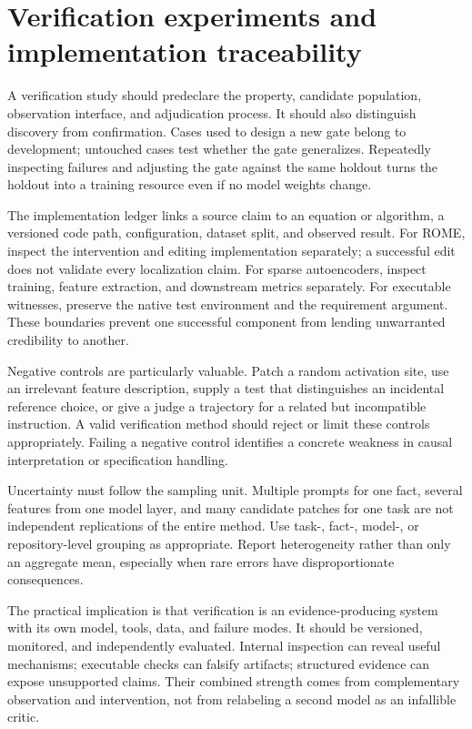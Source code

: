 \section{Verification experiments and implementation traceability}\label{sec:C25:experiments}
A verification study should predeclare the property, candidate population, observation interface, and adjudication process. It should also distinguish discovery from confirmation. Cases used to design a new gate belong to development; untouched cases test whether the gate generalizes. Repeatedly inspecting failures and adjusting the gate against the same holdout turns the holdout into a training resource even if no model weights change.

The implementation ledger links a source claim to an equation or algorithm, a versioned code path, configuration, dataset split, and observed result. For ROME, inspect the intervention and editing implementation separately; a successful edit does not validate every localization claim. For sparse autoencoders, inspect training, feature extraction, and downstream metrics separately. For executable witnesses, preserve the native test environment and the requirement argument. These boundaries prevent one successful component from lending unwarranted credibility to another.

Negative controls are particularly valuable. Patch a random activation site, use an irrelevant feature description, supply a test that distinguishes an incidental reference choice, or give a judge a trajectory for a related but incompatible instruction. A valid verification method should reject or limit these controls appropriately. Failing a negative control identifies a concrete weakness in causal interpretation or specification handling.

Uncertainty must follow the sampling unit. Multiple prompts for one fact, several features from one model layer, and many candidate patches for one task are not independent replications of the entire method. Use task-, fact-, model-, or repository-level grouping as appropriate. Report heterogeneity rather than only an aggregate mean, especially when rare errors have disproportionate consequences.

The practical implication is that verification is an evidence-producing system with its own model, tools, data, and failure modes. It should be versioned, monitored, and independently evaluated. Internal inspection can reveal useful mechanisms; executable checks can falsify artifacts; structured evidence can expose unsupported claims. Their combined strength comes from complementary observation and intervention, not from relabeling a second model as an infallible critic.
